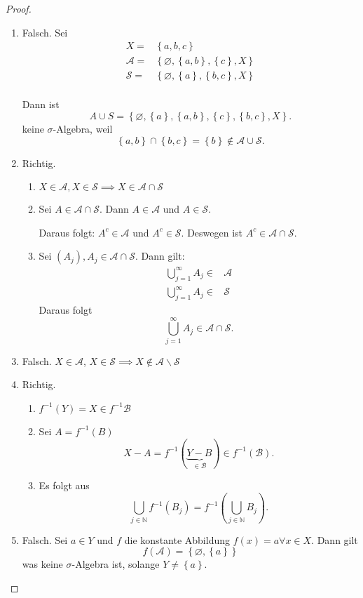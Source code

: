 \documentclass[prb,12pt]{revtex4-2}
\theoremstyle{definition}
\theoremstyle{definition}
\newenvironment{parts}{\begin{enumerate}[label=(\alph*)]}{\end{enumerate}}
\newcommand{\N}{\mathbb{N}}
\begin{document}
\begin{proof}
	\begin{parts}
	\item Falsch. Sei
		\begin{align*}
			X=&\left\{ a,b,c \right\} \\
			\mathcal A=&\left\{ \varnothing, \left\{ a,b \right\} , \left\{ c \right\} , X \right\} \\
			\mathcal S=&\left\{ \varnothing, \left\{ a \right\} , \left\{ b,c \right\} , X \right\}\\
		\end{align*}

		Dann ist 
		\[
		A\cup S=\left\{ \varnothing, \left\{ a \right\} ,\left\{ a,b \right\} , \left\{ c \right\} , \left\{ b,c \right\}, X  \right\} 
		.\] 
		keine $\sigma$-Algebra, weil
		\[
		\left\{ a,b \right\} \cap \left\{ b,c \right\} =\left\{ b \right\} \not\in \mathcal A \cup \mathcal S
		.\] 

	\item Richtig.
		\begin{enumerate}[label=(\arabic*)]
			\item $X\in \mathcal A, X\in \mathcal S\implies X \in\mathcal A \cap \mathcal S$
			\item Sei $A\in \mathcal A\cap \mathcal S$. Dann  $A\in \mathcal A$ und $A\in\mathcal S$. 

				Daraus folgt: $A^c\in\mathcal A$ und $A^c\in \mathcal S$. Deswegen ist $A^c\in \mathcal A \cap \mathcal S$.

			\item Sei $(A_j), A_j\in\mathcal A\cap \mathcal S$. Dann gilt:
\begin{align*}
	\bigcup_{j=1} ^\infty A_j\in& \mathcal A\\
	\bigcup_{j=1} ^\infty A_j\in& \mathcal S
\end{align*}
Daraus folgt
\[
	\bigcup_{j=1} ^\infty A_j\in \mathcal A\cap \mathcal S
.\] 
		\end{enumerate}
	\item Falsch. $X\in \mathcal A$, $X\in \mathcal S\implies X\not\in \mathcal A \backslash\mathcal S$
	\item Richtig.
		 \begin{enumerate}[label=(\arabic*)]
			 \item $f^{-1}(Y)=X\in f^{-1}\mathcal{B}$ 
			 \item Sei $A=f^{-1}(B)$
				 \[
					 X-A=f^{-1}(\underbrace{Y-B}_{\in \mathcal B})\in f^{-1}(\mathcal B)
			 .\] 

		 \item Es folgt aus
			 \[
				 \bigcup_{j\in \N} f^{-1}(B_j)=f^{-1}\left( \bigcup_{j\in \N} B_j \right) 
			 .\] 
	 \end{enumerate}
		 \item Falsch. Sei $a\in Y$ und $f$ die konstante Abbildung $f(x)=a\forall x\in X$. Dann gilt
			 \[
			 f(\mathcal A)=\left\{ \varnothing, \left\{ a \right\}  \right\} 
			 \] 
			 was keine $\sigma$-Algebra ist, solange $Y\neq \left\{ a \right\} $.
	\end{parts}
\end{proof}
\end{document}
